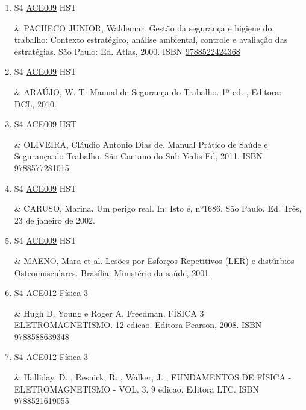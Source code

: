 \documentclass[12pt,a4paper]{book}
\begin{document}
\begin{enumerate}
 \item S4 \hyperref[PUD:ACE009]{ACE009} HST

&   PACHECO JUNIOR, Waldemar.  Gestão da segurança e higiene do trabalho: Contexto estratégico, análise ambiental, controle e avaliação das estratégias.  São Paulo: Ed.  Atlas, 2000.  ISBN \href{http://www.bn.br/site/pages/servicosProfissionais/agenciaISBN/isbnBusca/FbnBuscaISBNCatalogo.asp?pField=ISBN&pIntPagina=1&pISBN=22424368&nidbISBN=true&hidbISBN=true}{9788522424368}
 

 \item S4 \hyperref[PUD:ACE009]{ACE009} HST

&   ARAÚJO,  W.  T.  Manual de Segurança do Trabalho.  1ª ed. , Editora: DCL, 2010.
 \item S4 \hyperref[PUD:ACE009]{ACE009} HST

&   OLIVEIRA, Cláudio Antonio Dias de.  Manual Prático de Saúde e Segurança do Trabalho.  São Caetano do Sul: Yedis Ed, 2011.  ISBN \href{http://www.bn.br/site/pages/servicosProfissionais/agenciaISBN/isbnBusca/FbnBuscaISBNCatalogo.asp?pField=ISBN&pIntPagina=1&pISBN=77281015&nidbISBN=true&hidbISBN=true}{9788577281015}
 

 \item S4 \hyperref[PUD:ACE009]{ACE009} HST

&  CARUSO, Marina.  Um perigo real.  In: Isto é, nº1686.  São Paulo.  Ed.  Três, 23 de janeiro de 2002. 
 

 \item S4 \hyperref[PUD:ACE009]{ACE009} HST

&  MAENO, Mara et al.  Lesões por Esforços Repetitivos (LER) e distúrbios Osteomusculares.  Brasília: Ministério da saúde, 2001.
 \item S4 \hyperref[PUD:ACE012]{ACE012} Física 3

&  Hugh D.  Young e Roger A.  Freedman.  FÍSICA 3 ELETROMAGNETISMO.  12 edicao.  Editora Pearson, 2008.  ISBN \href{http://www.bn.br/site/pages/servicosProfissionais/agenciaISBN/isbnBusca/FbnBuscaISBNCatalogo.asp?pField=ISBN&pIntPagina=1&pISBN=88639348&nidbISBN=true&hidbISBN=true}{9788588639348}
 

 \item S4 \hyperref[PUD:ACE012]{ACE012} Física 3

&  Halliday, D. , Resnick, R. , Walker, J. , FUNDAMENTOS DE FÍSICA - ELETROMAGNETISMO - VOL.  3.  9 edicao.  Editora LTC.  ISBN \href{http://www.bn.br/site/pages/servicosProfissionais/agenciaISBN/isbnBusca/FbnBuscaISBNCatalogo.asp?pField=ISBN&pIntPagina=1&pISBN=21619055&nidbISBN=true&hidbISBN=true}{9788521619055}
 


\end{enumerate}
\end{document}
